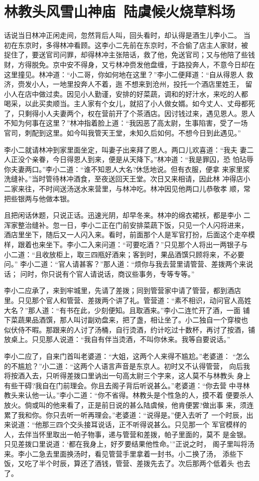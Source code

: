 \chapter{林教头风雪山神庙~陆虞候火烧草料场}

话说当日林冲正闲走间，忽然背后人叫，回头看时，却认得是酒生儿李小二。
当初在东京时，多得林冲看顾。这李小二先前在东京时，不合偷了店主人家财，被
捉住了，要送官司问罪，却得林冲主张陪话，救了他，免送官司；又与他陪了些钱
财，方得脱免。京中安不得身，又亏林冲赍发他盘缠，于路投奔人，不意今日却在
这里撞见。林冲道：“小二哥，你如何地在这里？”李小二便拜道：“自从得恩人
救济，赍发小人，一地里投奔人不着，迤不想来到沧州，投托一个酒店里姓王，
留小人在店中做过卖。因见小人勤谨，安排的好菜蔬，调和的好汁水，来吃的人都
喝采，以此买卖顺当。主人家有个女儿，就招了小人做女婿。如今丈人、丈母都死
了，只剩得小人夫妻两个，权在营前开了个茶酒店。因讨钱过来，遇见恩人。恩人
不知为何事在这里？”林冲指着脸上道：“我因恶了高太尉，生事陷害，受了一场
官司，刺配到这里。如今叫我管天王堂，未知久后如何。不想今日到此遇见。”

李小二就请林冲到家里面坐定，叫妻子出来拜了恩人。两口儿欢喜道：“我夫
妻二人正没个亲眷，今日得恩人到来，便是从天降下。”林冲道：“我是罪囚，恐
怕玷辱你夫妻两口。”李小二道：“谁不知恩人大名?休恁地说。但有衣服，便拿
来家里浆洗缝补。”当时管待林冲酒食，至夜送回天王堂。次日又来相请，因此林
冲得店小二家来往，不时间送汤送水来营里，与林冲吃。林冲因见他两口儿恭敬孝
顺，常把些银两与他做本银。

且把闲话休题，只说正话。迅速光阴，却早冬来。林冲的绵衣裙袄，都是李小
二浑家整治缝补。忽一日，李小二正在门前安排菜蔬下饭，只见一个人闪将进来，
酒店里坐下，随后又一人闪入来。看时，前面那个人是军官打扮，后面这个走卒模
样，跟着也来坐下。李小二入来问道：“可要吃酒？”只见那个人将出一两银子与
小二道：“且收放柜上，取三四瓶好酒来；客到时，果品酒馔只顾将来，不必要问。”
李小二道：“官人请甚客？”那人道：“烦你与我去营里请管营、差拨两个来说话；
问时，你只说有个官人请说话，商议些事务，专等专等。”

李小二应承了，来到牢城里，先请了差拨；同到管营家中请了管营，都到酒店
里。只见那个官人和管营、差拨两个讲了礼。管营道：“素不相识，动问官人高姓
大名？”那人道：“有书在此，少刻便知。且取酒来。”李小二连忙开了酒，一面
铺下菜蔬果品酒馔，那人叫讨副劝盘来，把了盏，相让坐了。小二独自一个穿梭也
似伏侍不暇。那跟来的人讨了汤桶，自行烫酒，约计吃过十数杯，再讨了按酒，铺
放桌上。只见那人说道：“我自有伴当烫酒，不叫你休来。我等自要说话。”

李小二应了，自来门首叫老婆道：“大姐，这两个人来得不尴尬。”老婆道：
“怎么的不尴尬？”小二道：“这两个人语言声音是东京人。初时又不认得管营，
向后我将按酒入去，只听得差拨口里讷出一句高太尉三个字来，这人莫不与林教头
身上有些干碍?我自在门前理会。你且去阁子背后听说甚么。”老婆道：“你去营
中寻林教头来认他一认。”李小二道：“你不省得。林教头是个性急的人，摸不着
便要杀人放火。倘或叫的他来看了，正是前日说的甚么陆虞候，他肯便罢?做出事
来，须连累了我和你。你只去听一听再理会。”老婆道：“说得是。”便入去听了
一个时辰，出来说道：“他那三四个交头接耳说话，正不听得说甚么。只见那一个
军官模样的人，去伴当怀里取出一帕子物事，递与管营和差拨，帕子里面的，莫不
是金银。只见差拨口里说道：‘都在我身上，好歹要结果他性命。’”正说之时，
阁子里叫将汤来。李小二急去里面换汤时，看见管营手里拿着一封书。小二换了汤，
添些下饭，又吃了半个时辰，算还了酒钱，管营、差拨先去了。次后那两个低着头
也去了。

